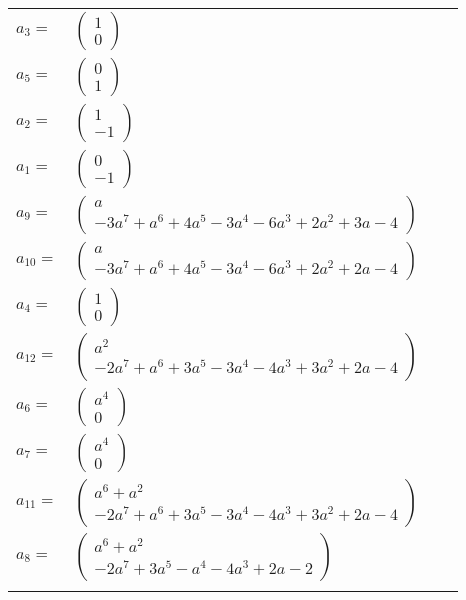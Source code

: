 \documentclass[1p]{elsarticle_modified}
\theoremstyle{definition}
\begin{document}
\begin{tabular}{m{7pt} m{180pt} m{7pt} m{180pt} }
\flushright $a_{3}=$&$\begin{pmatrix}1\\0\end{pmatrix}$ \\
\flushright $a_{5}=$&$\begin{pmatrix}0\\1\end{pmatrix}$ \\
\flushright $a_{2}=$&$\begin{pmatrix}1\\-1\end{pmatrix}$ \\
\flushright $a_{1}=$&$\begin{pmatrix}0\\-1\end{pmatrix}$ \\
\flushright $a_{9}=$&$\begin{pmatrix}a\\-3 a^7+a^6+4 a^5-3 a^4-6 a^3+2 a^2+3 a-4\end{pmatrix}$ \\
\flushright $a_{10}=$&$\begin{pmatrix}a\\-3 a^7+a^6+4 a^5-3 a^4-6 a^3+2 a^2+2 a-4\end{pmatrix}$ \\
\flushright $a_{4}=$&$\begin{pmatrix}1\\0\end{pmatrix}$ \\
\flushright $a_{12}=$&$\begin{pmatrix}a^2\\-2 a^7+a^6+3 a^5-3 a^4-4 a^3+3 a^2+2 a-4\end{pmatrix}$ \\
\flushright $a_{6}=$&$\begin{pmatrix}a^4\\0\end{pmatrix}$ \\
\flushright $a_{7}=$&$\begin{pmatrix}a^4\\0\end{pmatrix}$ \\
\flushright $a_{11}=$&$\begin{pmatrix}a^6+a^2\\-2 a^7+a^6+3 a^5-3 a^4-4 a^3+3 a^2+2 a-4\end{pmatrix}$ \\
\flushright $a_{8}=$&$\begin{pmatrix}a^6+a^2\\-2 a^7+3 a^5- a^4-4 a^3+2 a-2\end{pmatrix}$\\&\end{tabular}
\end{document}
